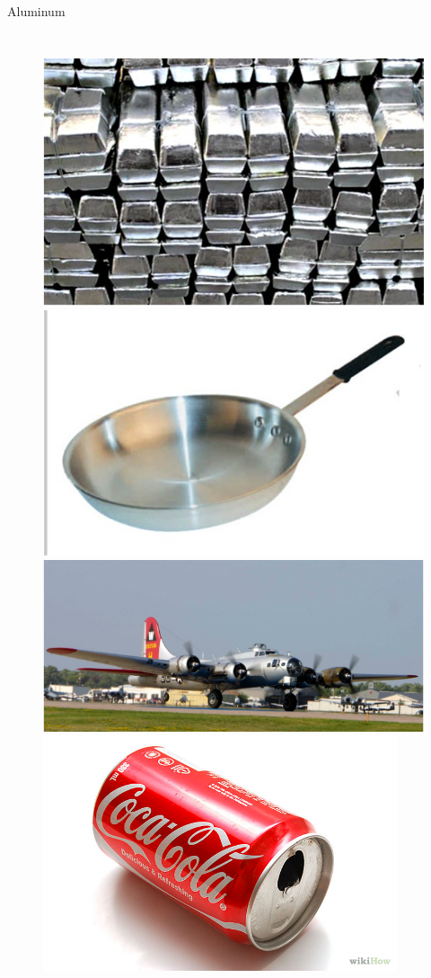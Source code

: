\documentclass[aspectratio=169]{beamer}
\begin{document}
\begin{frame}{Aluminum}
\begin{columns}
            \begin{figure}
                \centering
                \includegraphics[width=0.8\linewidth]{lectures/figures/Lab4_Al1.png}
                \includegraphics[width=0.8\linewidth]{lectures/figures/Lab4_Al2.png}
                \includegraphics[width=0.8\linewidth]{lectures/figures/Lab4_Al3.png}
                \includegraphics[width=0.8\linewidth]{lectures/figures/Lab4_Al4.png}
            \end{figure}

        \end{columns}

    \end{frame}
\end{document}
